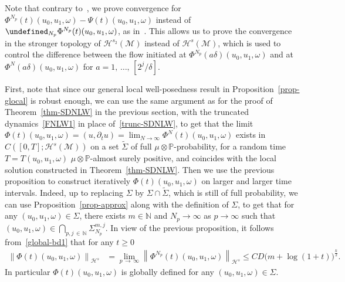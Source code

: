 \documentclass[AHL,Unicode,longabstracts,published]{cedram}
\newcommand{\Prob}{\mathbb{P}}
\newcommand{\N}{\mathbb{N}}
\let\P= \undefined
\newcommand{\P}{\mathbf{P}}
\newcommand{\M}{\mathcal{M}}
\renewcommand{\H}{\mathcal{H}}
\newcommand{\dl}{\delta}
\newcommand{\Si}{\Sigma}
\newcommand{\wt}{\widetilde}
\newcommand{\dt}{\partial_t}
\renewcommand{\o}{\omega}
\begin{document}
Note that contrary to~\cite{BTT2}, we prove convergence for $\Phi^{N_p}(t)(u_0,u_1,\o)-\Psi(t)(u_0,u_1,\o)$ instead of $\P_{N_p}\Phi^{N_p}(t)(u_0,u_1,\o)$, as in~\cite{BO96}. This allows us to prove the convergence in the stronger topology of $\H^{s_2}(\M)$ instead of $\H^s(\M)$, which is used to control the difference between the flow initiated at $\Phi^{N_p}(a\dl)(u_0,u_1,\o)$ and at $\Phi^N(a\dl)(u_0,u_1,\o)$ for $a=1,\,\dots,\,[2^j/\dl]$.

First, note that since our general local well-posedness result in Proposition~\ref{prop-glocal} is robust enough, we can use the same argument as for the proof of Theorem~\ref{thm-SDNLW} in the previous section, with the truncated dynamics~\eqref{FNLW1} in place of~\eqref{trunc-SDNLW}, to get that the limit $\Phi(t)(u_0,u_1,\o)=(u,\dt u) = \lim_{N\to\infty}\Phi^N(t)(u_0,u_1,\o)$ exists in $C([0,T];\H^s(\M))$ on a set $\wt\Si$ of full $\mu\otimes\Prob$-probability, for a random time $T=T(u_0,u_1,\o)$ $\mu\otimes\Prob$-almost surely positive, and coincides with the local solution constructed in Theorem~\ref{thm-SDNLW}. Then we use the previous proposition to construct iteratively $\Phi(t)(u_0,u_1,\o)$ on larger and larger time intervals. Indeed, up to replacing $\Si$ by $\Si\cap\wt\Si$, which is still of full probability, we can use Proposition~\ref{prop-approx} along with the definition of $\Si$, to get that for any $(u_0,u_1,\o)\in\Si$, there exists $m\in\N$ and $N_p\to\infty$ as $p\to\infty$ such that $(u_0,u_1,\o)\in \bigcap_{p,j\,\in\,\N}\Si_{N_p}^{m,j}$. In view of the previous proposition, it follows from~\eqref{global-bd1} that for any $t\ge 0$
\begin{align*}
\left\|\Phi(t)(u_0,u_1,\o)\right\|_{\H^{s}}&= \lim_{p\,\to\,\infty} \left\|\Phi^{N_p}(t)(u_0,u_1,\o)\right\|_{\H^{s}} \leq CD\big(m+\log(1+t)\big)^{\frac{k}2}.
\end{align*}
In particular $\Phi(t)(u_0,u_1,\o)$ is globally defined for any $(u_0,u_1,\o)\in\Si$.
\end{document}
